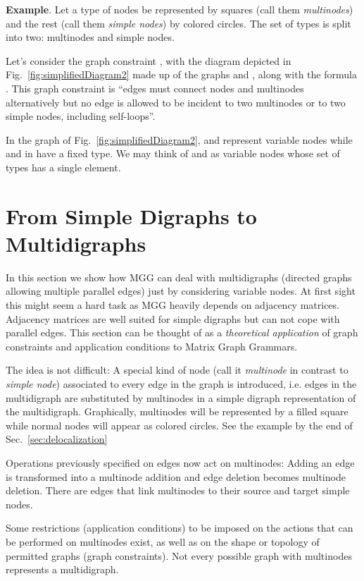 \documentclass{fundam}
\newcommand{\proofend}{\hfill}
\begin{document}
\noindent \textbf{Example}. Let a type of nodes be
represented by squares (call them \emph{multinodes}) and the rest
(call them \emph{simple nodes}) by colored circles. The set of types
 is split into two: multinodes and simple nodes.

Let's consider the graph constraint , with  the diagram depicted
in Fig.~\ref{fig:simplifiedDiagram2} made up of the graphs  and
, along with the formula . This graph constraint is
``edges must connect nodes and multinodes alternatively but no edge
is allowed to be incident to two multinodes or to two simple nodes,
including self-loops''.

In the graph  of Fig.~\ref{fig:simplifiedDiagram2},  and 
represent variable nodes while  and  in  have a fixed
type. We may think of  and  as variable nodes whose set of types
has a single element. \proofend




\section{From Simple Digraphs to Multidigraphs}
\label{sec:fromSimpleDigraphsToMultidigraphs}


In this section we show how MGG can deal with multidigraphs (directed
graphs allowing multiple parallel edges) just by considering variable
nodes. At first sight this might seem a hard task as MGG heavily
depends on adjacency matrices.  Adjacency matrices are well suited for
simple digraphs but can not cope with parallel edges. This section can
be thought of as a \emph{theoretical application} of graph constraints
and application conditions to Matrix Graph Grammars.

The idea is not difficult: A special kind of node (call it
\emph{multinode} in contrast to \emph{simple node}) associated to
every edge in the graph is introduced, i.e. edges in the multidigraph
are substituted by multinodes in a simple digraph representation of
the multidigraph.  Graphically, multinodes will be represented by a
filled square while normal nodes will appear as colored circles. See
the example by the end of Sec.~\ref{sec:delocalization}



Operations previously specified on edges now act on multinodes: Adding
an edge is transformed into a multinode addition and edge deletion
becomes multinode deletion.  There are edges that link multinodes to
their source and target simple nodes.

Some restrictions (application conditions) to be imposed on the
actions that can be performed on multinodes exist, as well as on the
shape or topology of permitted graphs (graph constraints). Not every
possible graph with multinodes represents a multidigraph.
\end{document}
